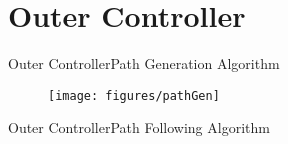 \section{Outer Controller}

\begin{frame}{Outer Controller}{Path Generation Algorithm}
    \begin{figure}[H]
        \centering
        \texttt{[image: figures/pathGen]} 
    \end{figure}       
\end{frame}

\begin{frame}{Outer Controller}{Path Following Algorithm}
    \begin{minipage}{0.6\linewidth}
    \end{minipage}\hfill      
    \begin{minipage}{0.2\linewidth}
    \end{minipage}\hfill \\ 
\end{frame}

